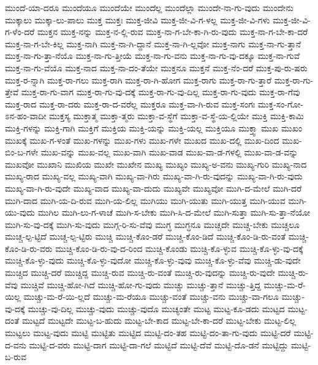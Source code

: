 {ಮುಂದೆ-ಯಾ-ದರೂ
ಮುಂದೆಯೂ
ಮುಂದೆಯೇ
ಮುಂದೆಲ್ಲ
ಮುಂದೆಲ್ಲಾ
ಮುಂದೇ-ನಾ-ಗು-ವುದು
ಮುಂದೇನು
ಮುಕ್ಕಾಲು
ಮುಕ್ಕಾ-ಲು-ಪಾಲು
ಮುಕ್ತ
ಮುಕ್ತಃ
ಮುಕ್ತ-ಜೀವಿ
ಮುಕ್ತ-ಜೀ-ವಿ-ಗ-ಳಲ್ಲ
ಮುಕ್ತ-ಜೀ-ವಿ-ಗಳು
ಮುಕ್ತ-ಜೀ-ವಿ-ಗ-ಳೆಂ-ದರೆ
ಮುಕ್ತನ
ಮುಕ್ತ-ನನ್ನು
ಮುಕ್ತ-ನ-ಲ್ಲಿ-ರುವ
ಮುಕ್ತ-ನಾ-ಗ-ಬೇ-ಕಾ-ಗಿ-ರು-ವುದು
ಮುಕ್ತ-ನಾ-ಗ-ಬೇ-ಕಾ-ದರೆ
ಮುಕ್ತ-ನಾ-ಗ-ಬೇ-ಕಿಲ್ಲ
ಮುಕ್ತ-ನಾಗಿ
ಮುಕ್ತ-ನಾ-ಗಿ-ದ್ದಾನೆ
ಮುಕ್ತ-ನಾ-ಗಿ-ಲ್ಲವೋ
ಮುಕ್ತ-ನಾಗು
ಮುಕ್ತ-ನಾ-ಗು-ತ್ತಾನೆ
ಮುಕ್ತ-ನಾ-ಗು-ತ್ತಾ-ನೆಯೊ
ಮುಕ್ತ-ನಾ-ಗು-ತ್ತೀಯೆ
ಮುಕ್ತ-ನಾ-ಗು-ವನು
ಮುಕ್ತ-ನಾ-ಗು-ವು-ದಕ್ಕೂ
ಮುಕ್ತ-ನಾ-ಗುವೆ
ಮುಕ್ತ-ನಾ-ಗು-ವೆಯೊ
ಮುಕ್ತ-ನಾದ
ಮುಕ್ತ-ನಾ-ದಂ-ತೆಯೇ
ಮುಕ್ತನೂ
ಮುಕ್ತನೆ
ಮುಕ್ತ-ನೆಂ-ದರೆ
ಮುಕ್ತ-ಪು-ರು-ಷರು
ಮುಕ್ತ-ರ-ನ್ನಾಗಿ
ಮುಕ್ತ-ರಾ-ಗಲು
ಮುಕ್ತ-ರಾಗಿ
ಮುಕ್ತ-ರಾ-ಗಿ-ಹೋಗ
ಮುಕ್ತ-ರಾಗು
ಮುಕ್ತ-ರಾ-ಗು-ತ್ತಾರೆ
ಮುಕ್ತ-ರಾ-ಗು-ತ್ತೇವೆ
ಮುಕ್ತ-ರಾ-ಗು-ವಾಗ
ಮುಕ್ತ-ರಾ-ಗು-ವು-ದಕ್ಕೆ
ಮುಕ್ತ-ರಾ-ಗು-ವು-ದಿಲ್ಲ
ಮುಕ್ತ-ರಾ-ಗು-ವುದು
ಮುಕ್ತ-ರಾ-ಗೆವು
ಮುಕ್ತ-ರಾದ
ಮುಕ್ತ-ರಾ-ದರು
ಮುಕ್ತ-ರಾ-ದ-ವರೆಲ್ಲ
ಮುಕ್ತರೂ
ಮುಕ್ತ-ವಾ-ಗಿ-ರುವ
ಮುಕ್ತ-ಸಂಗಃ
ಮುಕ್ತ-ಸಂ-ಗೋ-ಽನ-ಹಂ-ವಾದೀ
ಮುಕ್ತಸ್ಯ
ಮುಕ್ತಾತ್ಮ
ಮುಕ್ತಾ-ತ್ಮರು
ಮುಕ್ತಾ-ವ-ಸ್ಥೆಗೆ
ಮುಕ್ತಾ-ವ-ಸ್ಥೆ-ಯ-ಲ್ಲಿಯೇ
ಮುಕ್ತಿ
ಮುಕ್ತಿ-ಕಾಮಿ
ಮುಕ್ತಿ-ಗಳನ್ನು
ಮುಕ್ತಿ-ಗಾಗಿ
ಮುಕ್ತಿಗೆ
ಮುಕ್ತಿಯ
ಮುಕ್ತಿ-ಯನ್ನು
ಮುಕ್ತಿ-ಯಲ್ಲ
ಮುಕ್ತಿಯೂ
ಮುಕ್ತ್ವಾ
ಮುಖ
ಮುಖಂ
ಮುಖಕ್ಕೆ
ಮುಖ-ಗ-ಳಂತೆ
ಮುಖ-ಗಳನ್ನು
ಮುಖ-ಗಳು
ಮುಖ-ಗಳೇ
ಮುಖದ
ಮುಖ-ದಲ್ಲಿ
ಮುಖ-ದಿಂದ
ಮುಖ-ಬಿಂ-ಬ-ಗಳೇ
ಮುಖ-ವನ್ನು
ಮುಖ-ವಲ್ಲ
ಮುಖ-ವಾಗಿ
ಮುಖ-ವಾಡ
ಮುಖ-ವಾ-ಡ-ಗಳಲ್ಲಿ
ಮುಖ-ವಾ-ಡ-ವನ್ನು
ಮುಖವೋ
ಮುಖಾನಿ
ಮುಖಿಯ
ಮುಖೇ
ಮುಖೇನ
ಮುಖ್ಯ
ಮುಖ್ಯಂ
ಮುಖ್ಯ-ಅ-ವನು
ಮುಖ್ಯ-ಗುರಿ
ಮುಖ್ಯ-ನಾದ
ಮುಖ್ಯ-ರಾದ
ಮುಖ್ಯ-ವಲ್ಲ
ಮುಖ್ಯ-ವಾಗಿ
ಮುಖ್ಯ-ವಾ-ಗಿರು
ಮುಖ್ಯ-ವಾ-ಗಿ-ರು-ವುದನ್ನು
ಮುಖ್ಯ-ವಾ-ಗಿ-ರು-ವುದು
ಮುಖ್ಯ-ವಾ-ಗಿ-ರು-ವುದೇ
ಮುಖ್ಯ-ವಾದ
ಮುಖ್ಯ-ವಾ-ದುದು
ಮುಖ್ಯವೇ
ಮುಖ್ಯವೋ
ಮುಗಿ-ದ-ಮೇಲೆ
ಮುಗಿ-ದರೆ
ಮುಗಿ-ದಾದ
ಮುಗಿ-ಯ-ದಿ-ರುವ
ಮುಗಿ-ಯ-ಲಿಲ್ಲ
ಮುಗಿಯು
ಮುಗಿ-ಯುತು
ಮುಗಿ-ಯುತ್ತ
ಮುಗಿ-ಯುವ
ಮುಗಿ-ಯು-ವುದು
ಮುಗಿಲ
ಮುಗಿ-ಲು-ಗ-ಳಾಚೆ
ಮುಗಿ-ಸ-ಬೇಕು
ಮುಗಿ-ಸಿ-ದ-ಮೇಲೆ
ಮುಗಿ-ಸುತ್ತಾ
ಮುಗಿ-ಸು-ತ್ತಾ-ನೆಯೋ
ಮುಗಿ-ಸು-ವು-ದಕ್ಕೆ
ಮುಗಿ-ಸು-ವುದು
ಮುಗ್ಗ-ರಿ-ಸು-ವೆವು
ಮುಗ್ಧ
ಮುಗ್ಧನೂ
ಮುಚ್ಚದೇ
ಮುಚ್ಚ-ಬೇಕು
ಮುಚ್ಚಲೂ
ಮುಚ್ಚ-ಲ್ಪ-ಟ್ಟಿದೆ
ಮುಚ್ಚ-ಲ್ಪ-ಟ್ಟಿರು
ಮುಚ್ಚಿ
ಮುಚ್ಚಿ-ಕೊಂ-ಡರೆ
ಮುಚ್ಚಿ-ಕೊಂ-ಡಿದೆ
ಮುಚ್ಚಿ-ಕೊಂ-ಡಿ-ರು-ವಂತೆ
ಮುಚ್ಚಿ-ಕೊಂ-ಡಿ-ರು-ವರು
ಮುಚ್ಚಿ-ಕೊಂ-ಡಿ-ರು-ವು-ದ-ರಿಂದ
ಮುಚ್ಚಿ-ಕೊಂಡು
ಮುಚ್ಚಿ-ಕೊ-ಳ್ಳುವ
ಮುಚ್ಚಿ-ಕೊ-ಳ್ಳು-ವು-ದಕ್ಕೆ
ಮುಚ್ಚಿ-ಕೊ-ಳ್ಳು-ವುದು
ಮುಚ್ಚಿ-ಕೊ-ಳ್ಳು-ವುದೋ
ಮುಚ್ಚಿ-ಕೊ-ಳ್ಳು-ವುವು
ಮುಚ್ಚಿ-ಕೊ-ಳ್ಳು-ವೆವು
ಮುಚ್ಚಿ-ಡು-ವುದೇ
ಮುಚ್ಚಿದ
ಮುಚ್ಚಿ-ದರೆ
ಮುಚ್ಚಿದ್ದ
ಮುಚ್ಚಿ-ರುವ
ಮುಚ್ಚಿ-ರು-ವಂತೆ
ಮುಚ್ಚಿ-ರು-ವುದನ್ನು
ಮುಚ್ಚಿ-ರು-ವುದೇ
ಮುಚ್ಚಿ-ರು-ವೆವು
ಮುಚ್ಚಿವೆ
ಮುಚ್ಚಿ-ಹೋ-ಗಿದೆ
ಮುಚ್ಚಿ-ಹೋ-ಗು-ವುದು
ಮುಚ್ಚು
ಮುಚ್ಚು-ತ್ತಾನೆ
ಮುಚ್ಚು-ತ್ತಿದ್ದ
ಮುಚ್ಚು-ಮ-ರೆ-ಯಿಲ್ಲ
ಮುಚ್ಚು-ಮ-ರೆ-ಯಿ-ಲ್ಲದೆ
ಮುಚ್ಚು-ಮ-ರೆಯೂ
ಮುಚ್ಚು-ವಂತೆ
ಮುಚ್ಚು-ವನು
ಮುಚ್ಚು-ವಾ-ಗಲೂ
ಮುಚ್ಚು-ವು-ದಕ್ಕೆ
ಮುಚ್ಚು-ವು-ದಿಲ್ಲ
ಮುಚ್ಚು-ವುದು
ಮುಚ್ಚು-ವುದೊ
ಮುಚ್ಯಂತೇ
ಮುಟ್ಟ
ಮುಟ್ಟ-ಕೂ-ಡದು
ಮುಟ್ಟದ
ಮುಟ್ಟ-ದಂತೆ
ಮುಟ್ಟದೆ
ಮುಟ್ಟದೇ
ಮುಟ್ಟ-ಬ-ಹುದು
ಮುಟ್ಟ-ಬೇ-ಕಾದ
ಮುಟ್ಟ-ಬೇ-ಕಾ-ದರೆ
ಮುಟ್ಟ-ಬೇಕು
ಮುಟ್ಟ-ಲಿಲ್ಲ
ಮುಟ್ಟಲು
ಮುಟ್ಟ-ವುದು
ಮುಟ್ಟಿ
ಮುಟ್ಟಿತು
ಮುಟ್ಟಿದ
ಮುಟ್ಟಿ-ದಂ-ತಹ
ಮುಟ್ಟಿ-ದಂ-ತಾ-ಗು-ವುದು
ಮುಟ್ಟಿ-ದರೆ
ಮುಟ್ಟಿ-ದ-ವನು
ಮುಟ್ಟಿ-ದ-ವರು
ಮುಟ್ಟಿ-ದಾಗ
ಮುಟ್ಟಿ-ದಾ-ಗಲೆ
ಮುಟ್ಟಿದೆ
ಮುಟ್ಟಿ-ದೆವೆ
ಮುಟ್ಟಿ-ದೊ-ಡನೆ
ಮುಟ್ಟಿದ್ದು
ಮುಟ್ಟಿ-ಬ-ರುವ
}
